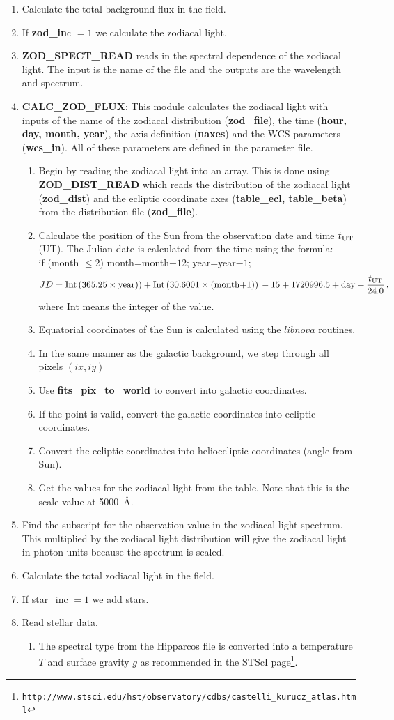 \documentclass[12pt]{article}
\renewcommand{\i}{\item}
\def\i{\item}
\def\fr{\frac}
\def\fr{\frac}
\newcommand{\no}{\nonumber}
\begin{document}
\begin{enumerate}
\begin{enumerate}
\end{enumerate}
\i Calculate the total background flux in the field.
\i If {\bf zod\_in}c $= 1$ we calculate the zodiacal light.
\i {\bf ZOD\_SPECT\_READ} reads in the spectral dependence of the zodiacal light.
The input is the name of the file and the outputs are the wavelength and spectrum.
\i {\bf CALC\_ZOD\_FLUX}: This module calculates the zodiacal light with inputs of
the name of the zodiacal distribution ({\bf zod\_file}), the time ({\bf hour, day,
month, year}), the axis definition ({\bf naxes}) and the WCS parameters ({\bf wcs\_in}).
All of these parameters are defined in the parameter file.
\begin{enumerate}
\i Begin by reading the zodiacal light into an array. This is done using
{\bf ZOD\_DIST\_READ} which reads the distribution of the  zodiacal light ({\bf zod\_dist})
and the ecliptic coordinate axes ({\bf table\_ecl, table\_beta}) from the distribution file
({\bf zod\_file}).
\i Calculate the position of the Sun from the observation date and time $t_{\rm UT}$ (UT).
The Julian date is calculated from the time using the formula:\\
            if (month $\leq 2$) { month=month$+12$; year=year$-1$;}
$$
JD  = \mbox{Int}\left(365.25\times \mbox{year})\right) +\mbox{Int}\left(30.6001
\times \mbox{(month+1)}\right) \no \\
- 15 + 1720996.5 + \mbox{day} +\fr{t_{\rm UT}}{24.0}\,,
$$
where Int means the integer of the value. 
\i Equatorial coordinates of the Sun is calculated using the $libnova$ routines.
\i In the same manner as the galactic background, we step through all pixels $(ix, iy)$
\i Use {\bf fits\_pix\_to\_world} to convert into galactic coordinates.
\i If the point is valid, convert the galactic coordinates into ecliptic coordinates.
\i Convert the ecliptic coordinates into helioecliptic coordinates (angle from Sun).
\i Get the values for the zodiacal light from the table. Note that this is the scale value at
 5000\, \AA.
\end{enumerate}
\i Find the subscript for the observation value in the zodiacal light spectrum. This
multiplied by the zodiacal light distribution will give the zodiacal light in photon units
because the spectrum is scaled.
\i Calculate the total zodiacal light in the field.
\i If star\_inc $= 1$ we add stars.
\i Read stellar data.
\begin{enumerate}
\i The spectral type from the Hipparcos file is converted into a temperature $T$ and surface
gravity $g$ as recommended in the STScI
page\footnote{\tt http://www.stsci.edu/hst/observatory/cdbs/castelli\_kurucz\_atlas.html}.

\end{enumerate}
\end{enumerate}
\end{document}
